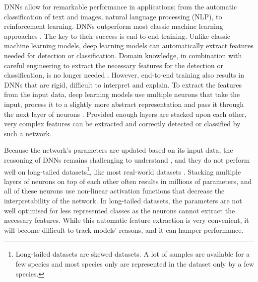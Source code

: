 \documentclass[a4paper, 12pt, oneside]{book} %
\begin{document}
DNNs allow for remarkable performance in applications: from the automatic classification of text and images, natural language processing (NLP), to reinforcement learning.
DNNs outperform most classic machine learning approaches \autocite{he_delving_2015, brown_language_2020}.
The key to their success is end-to-end training.
Unlike classic machine learning models, deep learning models can automatically extract features needed for detection or classification.
Domain knowledge, in combination with careful engineering to extract the necessary features for the detection or classification, is no longer needed \autocite{lecun_deep_2015}.
However, end-to-end training also results in DNNs that are rigid, difficult to interpret and explain.
To extract the features from the input data, deep learning models use multiple neurons that take the input, process it to a slightly more abstract representation and pass it through the next layer of neurons \autocite{schmidhuber_deep_2015}.
Provided enough layers are stacked upon each other, very complex features can be extracted and correctly detected or classified by such a network.

Because the network's parameters are updated based on its input data, the reasoning of DNNs remains challenging to understand \autocite{li_interpretable_2021, losch_interpretability_2019}, and they do not perform well on long-tailed datasets\footnote{Long-tailed datasets are skewed datasets. A lot of samples are available for a few species and most species only are represented in the dataset only by a few species.}, like most real-world datasets \autocite{van_horn_inaturalist_2018}.
Stacking multiple layers of neurons on top of each other often results in millions of parameters, and all of these neurons use non-linear activation functions that decrease the interpretability of the network.
In long-tailed datasets, the parameters are not well optimised for less represented classes as the neurons cannot extract the necessary features.
While this automatic feature extraction is very convenient, it will become difficult to track models' reasons, and it can hamper performance.
\end{document}
